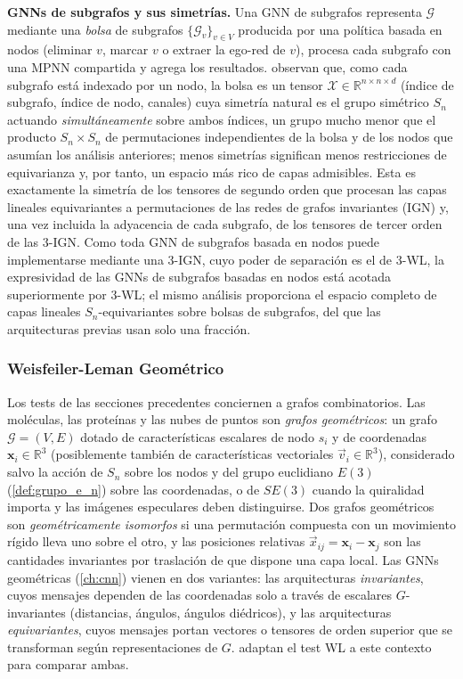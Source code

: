 \textbf{GNNs de subgrafos y sus simetrías.} Una \gls{GNN} de subgrafos representa $\mathcal{G}$ mediante una \textit{bolsa} de subgrafos $\{\mathcal{G}_v\}_{v \in V}$ producida por una política basada en nodos (eliminar $v$, marcar $v$ o extraer la ego-red de $v$), procesa cada subgrafo con una \gls{MPNN} compartida y agrega los resultados. \citet{frasca2022subgraphsymmetries} observan que, como cada subgrafo está indexado por un nodo, la bolsa es un tensor $\mathcal{X} \in \mathbb{R}^{n \times n \times d}$ (índice de subgrafo, índice de nodo, canales) cuya simetría natural es el grupo simétrico $S_n$ actuando \textit{simultáneamente} sobre ambos índices, un grupo mucho menor que el producto $S_n \times S_n$ de permutaciones independientes de la bolsa y de los nodos que asumían los análisis anteriores; menos simetrías significan menos restricciones de equivarianza y, por tanto, un espacio más rico de capas admisibles. Esta es exactamente la simetría de los tensores de segundo orden que procesan las capas lineales equivariantes a permutaciones de las redes de grafos invariantes (IGN) y, una vez incluida la adyacencia de cada subgrafo, de los tensores de tercer orden de las $3$-IGN. Como toda \gls{GNN} de subgrafos basada en nodos puede implementarse mediante una $3$-IGN, cuyo poder de separación es el de $3$-WL, la expresividad de las \glspl{GNN} de subgrafos basadas en nodos está acotada superiormente por $3$-WL; el mismo análisis proporciona el espacio completo de capas lineales $S_n$-equivariantes sobre bolsas de subgrafos, del que las arquitecturas previas usan solo una fracción.

\subsubsection{Weisfeiler-Leman Geométrico}\label{subsubsec:wl_geometrico}

Los tests de las secciones precedentes conciernen a grafos combinatorios. Las moléculas, las proteínas y las nubes de puntos son \textit{grafos geométricos}: un grafo $\mathcal{G} = (V, E)$ dotado de características escalares de nodo $s_i$ y de coordenadas $\mathbf{x}_i \in \mathbb{R}^3$ (posiblemente también de características vectoriales $\vec{v}_i \in \mathbb{R}^3$), considerado salvo la acción de $S_n$ sobre los nodos y del grupo euclidiano $E(3)$ (\autoref{def:grupo_e_n}) sobre las coordenadas, o de $SE(3)$ cuando la quiralidad importa y las imágenes especulares deben distinguirse. Dos grafos geométricos son \textit{geométricamente isomorfos} si una permutación compuesta con un movimiento rígido lleva uno sobre el otro, y las posiciones relativas $\vec{x}_{ij} = \mathbf{x}_i - \mathbf{x}_j$ son las cantidades invariantes por traslación de que dispone una capa local. Las \glspl{GNN} geométricas (\autoref{ch:cnn}) vienen en dos variantes: las arquitecturas \textit{invariantes}, cuyos mensajes dependen de las coordenadas solo a través de escalares $G$-invariantes (distancias, ángulos, ángulos diédricos), y las arquitecturas \textit{equivariantes}, cuyos mensajes portan vectores o tensores de orden superior que se transforman según representaciones de $G$. \citet{joshi2023expressive} adaptan el test WL a este contexto para comparar ambas.


